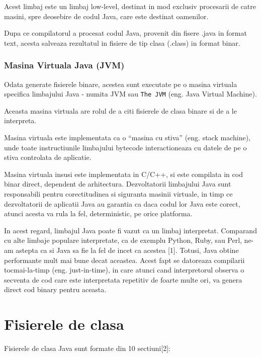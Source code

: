 \documentclass[]{article}
\begin{document}
Acest limbaj este un limbaj low-level, destinat in mod exclusiv
procesarii de catre masini, spre deosebire de codul Java, care este
destinat oamenilor.

Dupa ce compilatorul a procesat codul Java, provenit din fisere .java in
format text, acesta salveaza rezultatul in fisiere de tip clasa (.class)
in format binar.

\subsubsection{Masina Virtuala Java
	(JVM)}\label{masina-virtuala-java-jvm}

Odata generate fisierele binare, acestea sunt executate pe o masina
virtuala specifica limbajului Java - numita JVM sau \texttt{The\ JVM}
(eng. Java Virtual Machine).

Aceasta masina virtuala are rolul de a citi fisierele de clasa binare si
de a le interpreta.

Masina virtuala este implementata ca o ``masina cu stiva'' (eng. stack
machine), unde toate instructiunile limbajului bytecode interactioneaza
cu datele de pe o stiva controlata de aplicatie.

Masina virtuala insusi este implementata in C/C++, si este compilata in
cod binar direct, dependent de arhitectura. Dezvoltatorii limbajului
Java sunt responsabili pentru corectitudinea si siguranta masinii
virtuale, in timp ce dezvoltatorii de aplicatii Java au garantia ca daca
codul lor Java este corect, atunci acesta va rula la fel, deterministic,
pe orice platforma.

In acest regard, limbajul Java poate fi vazut ca un limbaj interpretat.
Comparand cu alte limbaje populare interpretate, ca de exemplu Python,
Ruby, sau Perl, ne-am astepta ca si Java sa fie la fel de incet ca
acestea {[}1{]}. Totusi, Java obtine performante mult mai bune decat
aceastea. Acest fapt se datoreaza compilarii tocmai-la-timp (eng.
just-in-time), in care atunci cand interpretorul observa o secventa de
cod care este interpretata repetitiv de foarte multe ori, va genera
direct cod binary pentru aceasta.

\section{Fisierele de clasa}\label{fisierele-de-clasa}

Fisierele de clasa Java sunt formate din 10 sectiuni{[}2{]}:
\end{document}
